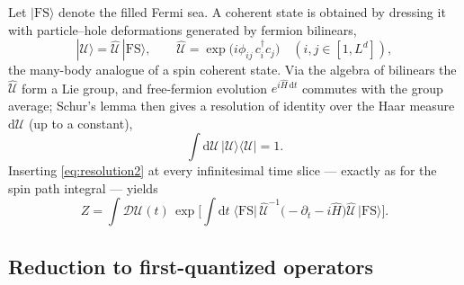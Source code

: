 \documentclass[11pt]{article}
\theoremstyle{remark}
\begin{document}
Let $|\mathrm{FS}\rangle$ denote the filled Fermi sea. A coherent state is
obtained by dressing it with particle--hole deformations generated by fermion
bilinears,
\begin{equation}
\label{eq:cohstate}
|\mathcal U\rangle = \hat{\mathcal U}\,|\mathrm{FS}\rangle,
\qquad
\hat{\mathcal U} = \exp\!\big(i\phi_{ij}\,c_i^\dagger c_j\big)
\quad (i,j\in[1,L^d]),
\end{equation}
the many-body analogue of a spin coherent state. Via the algebra of bilinears the
$\hat{\mathcal U}$ form a Lie group, and free-fermion evolution
$e^{i\hat H\,\mathrm{d} t}$ commutes with the group average; Schur's lemma then gives a
resolution of identity over the Haar measure $\mathrm{d}\mathcal U$ (up to a constant),
\begin{equation}
\label{eq:resolution2}
\int \mathrm{d}\mathcal U\, |\mathcal U\rangle\langle\mathcal U| = 1 .
\end{equation}
Inserting \eqref{eq:resolution2} at every infinitesimal time slice --- exactly as
for the spin path integral --- yields
\begin{equation}
\label{eq:Zpath}
Z = \int \mathcal D\mathcal U(t)\,
\exp\!\Big[\int \mathrm{d} t\;
\big\langle \mathrm{FS}\big|\,\hat{\mathcal U}^{-1}
\big(-\partial_t - i\hat H\big)\hat{\mathcal U}\,\big|\mathrm{FS}\big\rangle\Big].
\end{equation}

\subsection{Reduction to first-quantized operators}
\end{document}
